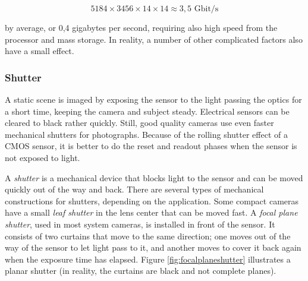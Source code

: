\begin{equation} \label{eq:eos1dspeed}
5184 \times 3456 \times 14 \times 14 \approx 3,5\text{ Gbit/s}
\end{equation}

by average, or 0,4 gigabytes per second, requiring also high speed from the processor and mass storage.
In reality, a number of other complicated factors also have a small effect.


\subsubsection{Shutter} %


A static scene is imaged by exposing the sensor to the light passing the optics for a short time, keeping the camera and subject steady.
Electrical sensors can be cleared to black rather quickly.
Still, good quality cameras use even faster mechanical shutters for photographs.
Because of the rolling shutter effect of a CMOS sensor, it is better to do the reset and readout phases when the sensor is not exposed to light.





A \emph{shutter} is a mechanical device that blocks light to the sensor and can be moved quickly out of the way and back.
There are several types of mechanical constructions for shutters, depending on the application.
Some compact cameras have a small \emph{leaf shutter} in the lens center that can be moved fast.
A \emph{focal plane shutter}, used in most system cameras, is installed in front of the sensor.
It consists of two curtains that move to the same direction; one moves out of the way of the sensor to let light pass to it, and another moves to cover it back again when the exposure time has elapsed.
Figure \ref{fig:focalplaneshutter} illustrates a planar shutter (in reality, the curtains are black and not complete planes).

